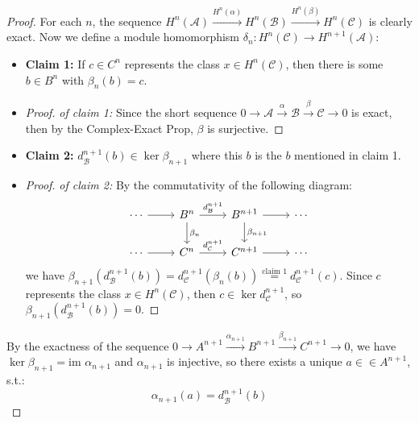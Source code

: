 \begin{proof}
    For each $n$, the sequence $H^n (\mathcal{A}) \xrightarrow{H^n(\alpha)} H^n(\mathcal{B}) \xrightarrow{H^n(\beta)} H^n (\mathcal{C})$ is clearly exact. Now we define a module homomorphism $\delta_n: H^n (\mathcal{C}) \to H^{n+1} (\mathcal{A})$:
    \begin{itemize}
        \item \textbf{Claim 1:} If $c\in C^n$ represents the class $x\in H^n(\mathcal{C})$, then there is some $b\in B^n$ with $\beta_n (b)=c$.

        \item \begin{proof}
            \textit{of claim 1:} Since the short sequence $0 \to \mathcal{A} \xrightarrow{\alpha} \mathcal{B} \xrightarrow{\beta} \mathcal{C} \to 0$ is exact, then by the Complex-Exact Prop, $\beta$ is surjective.
        \end{proof}

        \item \textbf{Claim 2:} $d^{n+1}_\mathcal{B} (b) \in \ker \beta_{n+1}$ where this $b$ is the $b$ mentioned in claim 1.
        \item \begin{proof}
            \textit{of claim 2:} By the commutativity of the following diagram:
            \[
            \begin{tikzcd}
            \cdots \arrow[r] & B^n \arrow[r, "d^{n+1}_{\mathcal{B}}"] \arrow[d, "\beta_n"] & B^{n+1} \arrow[r] \arrow[d, "\beta_{n+1}"] & \cdots \\
            \cdots \arrow[r] & C^n \arrow[r, "d^{n+1}_{\mathcal{C}}"]                    & C^{n+1} \arrow[r]                   & \cdots
            \end{tikzcd}
            \]
            we have $\beta_{n+1} (d^{n+1}_\mathcal{B} (b))= d_\mathcal{C}^{n+1} (\beta_n(b)) \overset{\text{claim 1}}{=} d_\mathcal{C}^{n+1} (c)$. Since $c$ represents the class $x\in H^n(\mathcal{C})$, then $c\in \ker d_\mathcal{C}^{n+1}$, so $\beta_{n+1}(d_\mathcal{B}^{n+1} (b))=0$.
        \end{proof}
    \end{itemize}
    By the exactness of the sequence $0 \to A^{n+1} \xrightarrow{\alpha_{n+1}} B^{n+1} \xrightarrow{\beta_{n+1}} C^{n+1} \to 0$, we have $\ker \beta_{n+1} =\text{im } \alpha_{n+1}$ and $\alpha_{n+1}$ is injective, so there exists a unique $a \in \in A^{n+1}$, s.t.: 
    \begin{equation*}
        \alpha_{n+1} (a)= d_\mathcal{B}^{n+1} (b) \tag{*}
    \end{equation*}


\end{proof}
